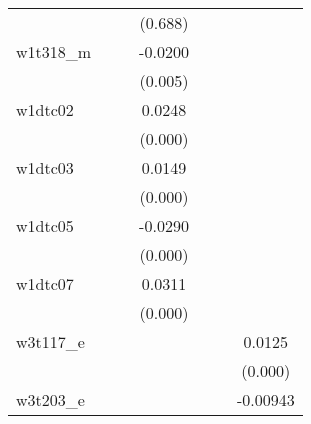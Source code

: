 {\begin{tabular}{l*{6}{c}}
            &                     &                     &     (0.688)         &                     &                     &                     \\
[1em]
w1t318\_m    &                     &                     &     -0.0200\sym{***}&                     &                     &                     \\
            &                     &                     &     (0.005)         &                     &                     &                     \\
[1em]
w1dtc02     &                     &                     &      0.0248\sym{***}&                     &                     &                     \\
            &                     &                     &     (0.000)         &                     &                     &                     \\
[1em]
w1dtc03     &                     &                     &      0.0149\sym{***}&                     &                     &                     \\
            &                     &                     &     (0.000)         &                     &                     &                     \\
[1em]
w1dtc05     &                     &                     &     -0.0290\sym{***}&                     &                     &                     \\
            &                     &                     &     (0.000)         &                     &                     &                     \\
[1em]
w1dtc07     &                     &                     &      0.0311\sym{***}&                     &                     &                     \\
            &                     &                     &     (0.000)         &                     &                     &                     \\
[1em]
w3t117\_e    &                     &                     &                     &                     &                     &      0.0125\sym{***}\\
            &                     &                     &                     &                     &                     &     (0.000)         \\
[1em]
w3t203\_e    &                     &                     &                     &                     &                     &    -0.00943\sym{**} \\

\end{tabular}}
